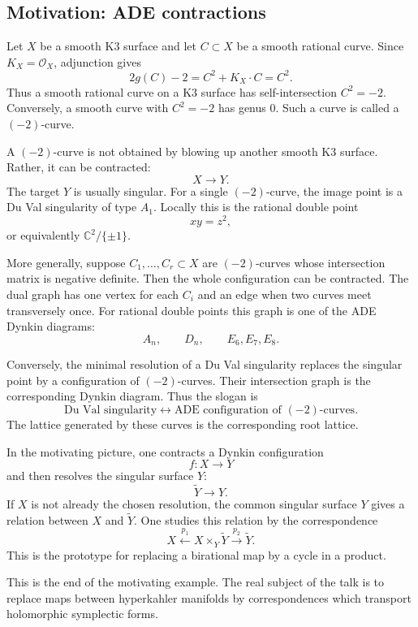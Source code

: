 \subsection{Motivation: ADE contractions}
\label{subsection-ade-contractions}

Let $X$ be a smooth K3 surface and let
$C \subset X$ be a smooth rational curve.
Since $K_X=\mathcal{O}_X$, adjunction gives
$$
2g(C)-2=C^2+K_X\cdot C=C^2.
$$
Thus a smooth rational curve on a K3 surface
has self-intersection $C^2=-2$.
Conversely, a smooth curve with $C^2=-2$
has genus $0$.
Such a curve is called a $(-2)$-curve.

\medskip
A $(-2)$-curve is not obtained by blowing up
another smooth K3 surface.
Rather, it can be contracted:
$$
X \longrightarrow Y.
$$
The target $Y$ is usually singular.
For a single $(-2)$-curve, the image point is
a Du Val singularity of type $A_1$.
Locally this is the rational double point
$$
xy=z^2,
$$
or equivalently $\mathbb{C}^2/\{\pm 1\}$.

\medskip
More generally, suppose
$C_1,\ldots,C_r \subset X$ are $(-2)$-curves
whose intersection matrix is negative
definite.
Then the whole configuration can be
contracted.
The dual graph has one vertex for each
$C_i$ and an edge when two curves meet
transversely once.
For rational double points this graph is one
of the ADE Dynkin diagrams:
$$
A_n,\qquad D_n,\qquad E_6,E_7,E_8.
$$

\medskip
Conversely, the minimal resolution of a
Du Val singularity replaces the singular
point by a configuration of $(-2)$-curves.
Their intersection graph is the corresponding
Dynkin diagram.
Thus the slogan is
$$
\text{Du Val singularity}
\longleftrightarrow
\text{ADE configuration of }
(-2)\text{-curves}.
$$
The lattice generated by these curves is the
corresponding root lattice.

\medskip
In the motivating picture, one contracts a
Dynkin configuration
$$
f:X\longrightarrow Y
$$
and then resolves the singular surface $Y$:
$$
\widetilde{Y}\longrightarrow Y.
$$
If $X$ is not already the chosen resolution,
the common singular surface $Y$ gives a
relation between $X$ and $\widetilde{Y}$.
One studies this relation by the
correspondence
$$
X \xleftarrow{\ p_1\ }
X\times_Y\widetilde{Y}
\xrightarrow{\ p_2\ }\widetilde{Y}.
$$
This is the prototype for replacing a
birational map by a cycle in a product.

\medskip
This is the end of the motivating example.
The real subject of the talk is to replace
maps between hyperkahler manifolds by
correspondences which transport holomorphic
symplectic forms.

